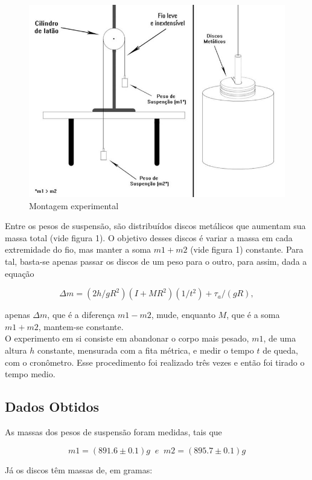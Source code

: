 \documentclass[12pt,a4paper]{article}
\begin{document}
\newpage

\begin{figure}
\centering
\includegraphics[scale=0.55]{FigUnica.jpg}
\caption{Montagem experimental}
\label{Fig1}
\end{figure}

Entre os pesos de suspensão, são distribuídos discos metálicos que aumentam sua massa total (vide figura 1). O objetivo desses discos é variar a massa em cada extremidade do fio, mas manter a soma $m1 + m2$ (vide figura 1) constante. Para tal, basta-se apenas passar os discos de um peso para o outro, para assim, dada a equação

$$\Delta m = (2h/gR^2)(I + MR^2)(1/t^2) + \tau_a/(gR),$$

apenas $\Delta m$, que é a diferença $m1 - m2$, mude, enquanto $M$, que é a soma $m1 + m2$, mantem-se constante.\\

O experimento em si consiste em abandonar o corpo mais pesado, $m1$, de uma altura $h$ constante, mensurada com a fita métrica, e medir o tempo $t$ de queda, com o cronômetro. Esse procedimento foi realizado três vezes e então foi tirado o tempo medio.

\subsection{Dados Obtidos}
As massas dos pesos de suspensão foram medidas, tais que

$$m1 = (891.6 \pm 0.1)g \;\; e \;\; m2 = (895.7 \pm 0.1)g$$

Já os discos têm massas de, em gramas:
\end{document}
